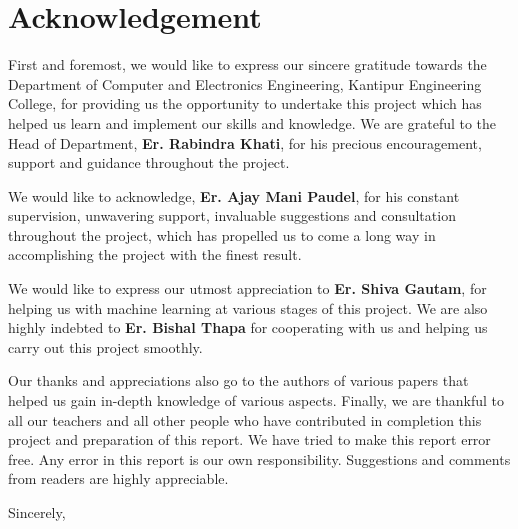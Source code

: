 
\clearpage


\KECcoverpage %
\KECtitlepage %


\KECcopyright %

\KECapproval %

\chapter*{Acknowledgement}
First and foremost, we would like to express our sincere gratitude towards the Department of Computer and Electronics Engineering, Kantipur Engineering College, for providing us the opportunity to undertake this project which has helped us learn and implement our skills and knowledge. We are grateful to the Head of Department, \textbf{Er. Rabindra Khati}, for his precious encouragement, support and guidance throughout the project. \par
We would like to acknowledge, \textbf{Er. Ajay Mani Paudel}, for his constant supervision, unwavering support, invaluable suggestions and consultation throughout the project, which has propelled us to come a long way in accomplishing the project with the finest result.\par
We would like to express our utmost appreciation to \textbf{Er. Shiva Gautam}, for helping us with machine learning at various stages of this project. We are also highly indebted to \textbf{Er. Bishal Thapa} for cooperating with us and helping us carry out this project smoothly.
\par
Our thanks and appreciations also go to the authors of various papers that helped us gain in-depth knowledge of various aspects. Finally, we are thankful to all our teachers and all other people who have contributed in completion this project and preparation of this report. We have tried to make this report error free. Any error in this report is our own responsibility. Suggestions and comments from readers are highly appreciable.\\
\par
\begin{flushleft}
\vskip -20pt
Sincerely, \\
\submittedBy
\end{flushleft}

